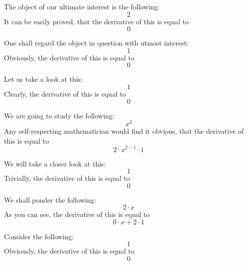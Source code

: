 \documentclass{article}
\begin{document}
The object of our ultimate interest is the following:
\begin{equation}
2 
\end{equation}
It can be easily proved, that the derivative of this is equal to
\begin{equation}
0 
\end{equation}

One shall regard the object in question with utmost interest:
\begin{equation}
1 
\end{equation}
Obviously, the derivative of this is equal to
\begin{equation}
0 
\end{equation}

Let us take a look at this:
\begin{equation}
1 
\end{equation}
Clearly, the derivative of this is equal to
\begin{equation}
0 
\end{equation}

We are going to study the following:
\begin{equation}
x ^{2 } 
\end{equation}
Any self-respecting mathematician would find it obvious, that the derivative of this is equal to
\begin{equation}
2 \cdot x ^{2 - 1 } \cdot 1 
\end{equation}

We will take a closer look at this:
\begin{equation}
1 
\end{equation}
Trivially, the derivative of this is equal to
\begin{equation}
0 
\end{equation}

We shall ponder the following:
\begin{equation}
2 \cdot x 
\end{equation}
As you can see, the derivative of this is equal to
\begin{equation}
0 \cdot x + 2 \cdot 1 
\end{equation}

Consider the following:
\begin{equation}
1 
\end{equation}
Obviously, the derivative of this is equal to
\begin{equation}
0 
\end{equation}
\end{document}
